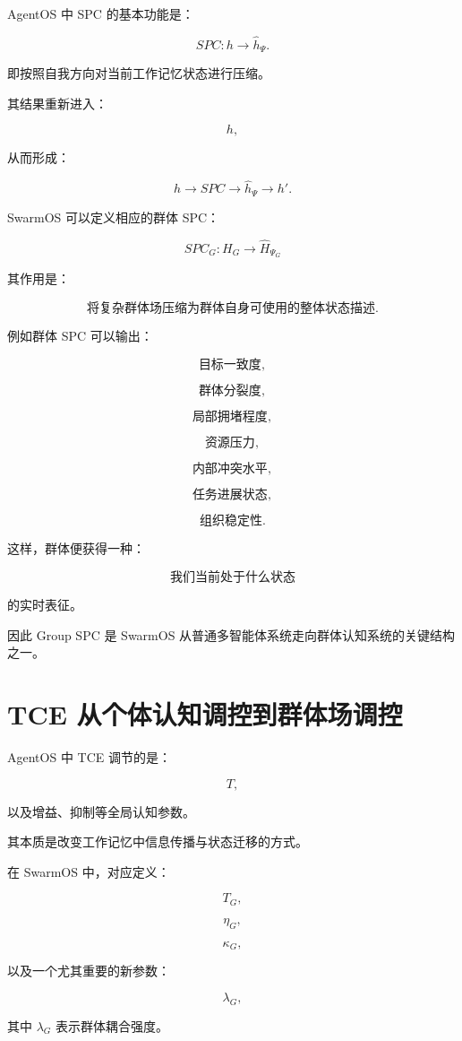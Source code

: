 AgentOS 中 SPC 的基本功能是：

\[
SPC:
h
\rightarrow
\hat h_{\Psi}.
\]

即按照自我方向对当前工作记忆状态进行压缩。

其结果重新进入：

\[
h,
\]

从而形成：

\[
h
\rightarrow
SPC
\rightarrow
\hat h_{\Psi}
\rightarrow
h'.
\]

SwarmOS 可以定义相应的群体 SPC：

\[
\boxed{
SPC_G:
H_G
\rightarrow
\hat H_{\Psi_G}
}
\]

其作用是：

\[
\text{将复杂群体场压缩为群体自身可使用的整体状态描述}.
\]

例如群体 SPC 可以输出：

\[
\text{目标一致度},
\]

\[
\text{群体分裂度},
\]

\[
\text{局部拥堵程度},
\]

\[
\text{资源压力},
\]

\[
\text{内部冲突水平},
\]

\[
\text{任务进展状态},
\]

\[
\text{组织稳定性}.
\]

这样，群体便获得一种：

\[
\boxed{
\text{我们当前处于什么状态}
}
\]

的实时表征。

因此 Group SPC 是 SwarmOS 从普通多智能体系统走向群体认知系统的关键结构之一。


\section{TCE 从个体认知调控到群体场调控}

AgentOS 中 TCE 调节的是：

\[
T,
\]

以及增益、抑制等全局认知参数。

其本质是改变工作记忆中信息传播与状态迁移的方式。

在 SwarmOS 中，对应定义：

\[
T_G,
\]

\[
\eta_G,
\]

\[
\kappa_G,
\]

以及一个尤其重要的新参数：

\[
\lambda_G,
\]

其中 $\lambda_G$ 表示群体耦合强度。

